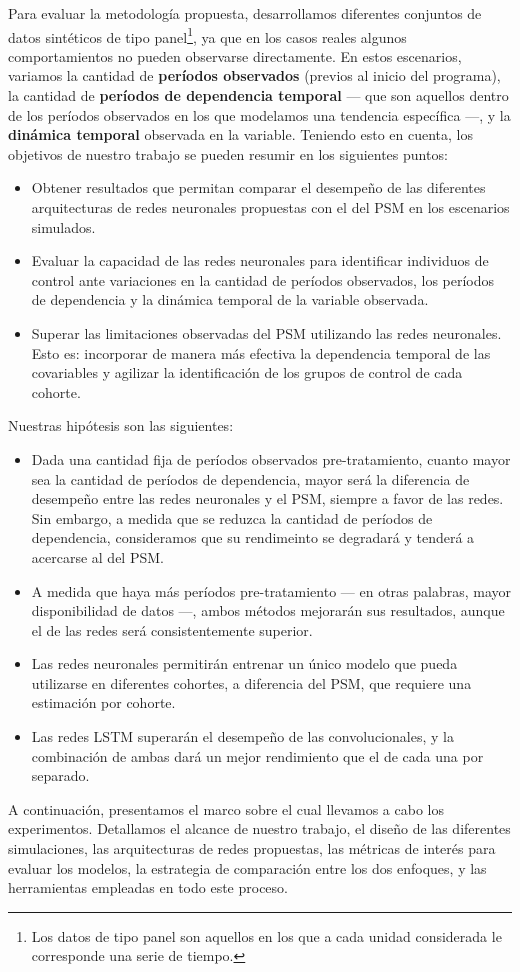 \documentclass[../main.tex]{subfiles}
\begin{document}
Para evaluar la metodología propuesta, desarrollamos diferentes conjuntos de datos
sintéticos de tipo panel\footnote{Los datos de tipo panel son aquellos en los que a cada
unidad considerada le corresponde una serie de tiempo.}, ya que en los casos reales
algunos comportamientos no pueden observarse directamente. En estos escenarios, variamos
la cantidad de \textbf{períodos observados} (previos al inicio del programa), la cantidad
de \textbf{períodos de dependencia temporal} — que son aquellos dentro de los períodos
observados en los que modelamos una tendencia específica —, y la \textbf{dinámica
temporal} observada en la variable. Teniendo esto en cuenta, los objetivos de nuestro
trabajo se pueden resumir en los siguientes puntos:
\begin{itemize}
    \item Obtener resultados que permitan comparar el desempeño de las diferentes
    arquitecturas de redes neuronales propuestas con el del PSM en los escenarios
    simulados.
    \item Evaluar la capacidad de las redes neuronales para identificar individuos de
    control ante variaciones en la cantidad de períodos observados, los períodos de
    dependencia y la dinámica temporal de la variable observada.
    \item Superar las limitaciones observadas del PSM utilizando las redes neuronales.
    Esto es: incorporar de manera más efectiva la dependencia temporal de las covariables
    y agilizar la identificación de los grupos de control de cada cohorte.
\end{itemize}

Nuestras hipótesis son las siguientes:
\begin{itemize}
    \item Dada una cantidad fija de períodos observados pre-tratamiento, cuanto mayor sea
    la cantidad de períodos de dependencia, mayor será la diferencia de desempeño entre
    las redes neuronales y el PSM, siempre a favor de las redes. Sin embargo, a medida que
    se reduzca la cantidad de períodos de dependencia, consideramos que su rendimeinto se
    degradará y tenderá a acercarse al del PSM.
    \item A medida que haya más períodos pre-tratamiento — en otras palabras, mayor
    disponibilidad de datos —, ambos métodos mejorarán sus resultados, aunque el de las
    redes será consistentemente superior.
    \item Las redes neuronales permitirán entrenar un único modelo que pueda utilizarse en
    diferentes cohortes, a diferencia del PSM, que requiere una estimación por cohorte.
    \item Las redes LSTM superarán el desempeño de las convolucionales, y la combinación de
    ambas dará un mejor rendimiento que el de cada una por separado.
\end{itemize}

A continuación, presentamos el marco sobre el cual llevamos a cabo los experimentos.
Detallamos el alcance de nuestro trabajo, el diseño de las diferentes simulaciones, las
arquitecturas de redes propuestas, las métricas de interés para evaluar los modelos, la
estrategia de comparación entre los dos enfoques, y las herramientas empleadas en todo
este proceso.
\end{document}
